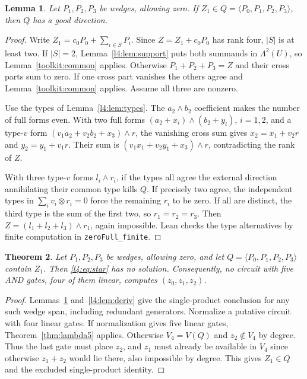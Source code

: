 \documentclass[11pt,a4paper]{article}
\theoremstyle{plain}
\newtheorem{theorem}{Theorem}
\newtheorem{lemma}[theorem]{Lemma}
\theoremstyle{remark}
\theoremstyle{plain}
\begin{document}
\begin{lemma}\label{l4:lem:goodspan}
Let $P_1,P_2,P_3$ be wedges, allowing zero. If $Z_1\in Q=\langle P_0,P_1,P_2,P_3\rangle$, then $Q$ has a good direction.
\end{lemma}
\begin{proof}
Write $Z_1=c_0P_0+\sum_{i\in S}P_i$. Since $Z=Z_1+c_0P_0$ has rank four, $|S|$ is at least two. If $|S|=2$, Lemma~\ref{l4:lem:support} puts both summands in $\Lambda^2(U)$, so Lemma~\ref{toolkit:common} applies. Otherwise $P_1+P_2+P_3=Z$ and their cross parts sum to zero. If one cross part vanishes the others agree and Lemma~\ref{toolkit:common} applies. Assume all three are nonzero.

Use the types of Lemma~\ref{l4:lem:types}. The $a_2\wedge b_2$ coefficient makes the number of full forms even. With two full forms $(a_2+x_i)\wedge(b_2+y_i)$, $i=1,2$, and a type-$v$ form $(v_1a_2+v_2b_2+x_3)\wedge r$, the vanishing cross sum gives $x_2=x_1+v_2r$ and $y_2=y_1+v_1r$. Their sum is $(v_1x_1+v_2y_1+x_3)\wedge r$, contradicting the rank of $Z$.

With three type-$v$ forms $l_i\wedge r_i$, if the types all agree the external direction annihilating their common type kills $Q$. If precisely two agree, the independent types in $\sum_i v_i\otimes r_i=0$ force the remaining $r_i$ to be zero. If all are distinct, the third type is the sum of the first two, so $r_1=r_2=r_3$. Then $Z=(l_1+l_2+l_3)\wedge r_1$, again impossible. Lean checks the type alternatives by finite computation in \nolinkurl{zeroFull_finite}.
\end{proof}

\begin{theorem}\label{l4:thm:main}
Let $P_1,P_2,P_3$ be wedges, allowing zero, and let $Q=\langle P_0,P_1,P_2,P_3\rangle$ contain $Z_1$. Then \eqref{l4:eq:star} has no solution. Consequently, no circuit with five AND gates, four of them linear, computes $(z_0,z_1,z_2)$.
\end{theorem}
\begin{proof}
Lemmas~\ref{l4:lem:goodspan} and~\ref{l4:lem:deriv} give the single-product conclusion for any such wedge span, including redundant generators. Normalize a putative circuit with four linear gates. If normalization gives five linear gates, Theorem~\ref{thm:lambda5} applies. Otherwise $V_4=V(Q)$ and $z_2\notin V_4$ by degree. Thus the last gate must place $z_2$, and $z_1$ must already be available in $V_4$ since otherwise $z_1+z_2$ would lie there, also impossible by degree. This gives $Z_1\in Q$ and the excluded single-product identity.
\end{proof}
\end{document}
